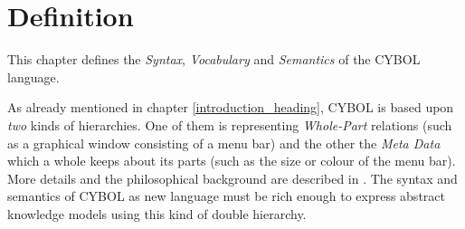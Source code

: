 %
%
%
%
%
%

\chapter{Definition}
\label{definition_heading}

This chapter defines the \emph{Syntax}, \emph{Vocabulary} and \emph{Semantics}
of the CYBOL language.

As already mentioned in chapter \ref{introduction_heading}, CYBOL is based upon
\emph{two} kinds of hierarchies. One of them is representing \emph{Whole-Part}
relations (such as a graphical window consisting of a menu bar) and the other
the \emph{Meta Data} which a whole keeps about its parts (such as the size or
colour of the menu bar). More details and the philosophical background are
described in \cite{cybopbook}. The syntax and semantics of CYBOL as new
language must be rich enough to express abstract knowledge models using this
kind of double hierarchy.




